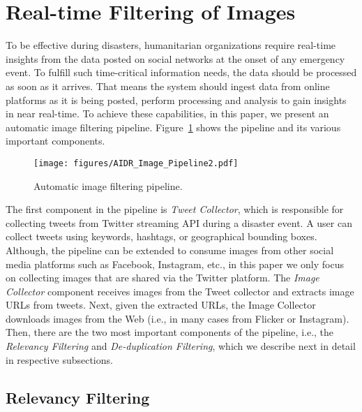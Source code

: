 \documentclass{iscram}
\begin{document}
\section{Real-time Filtering of Images}%

To be effective during disasters, humanitarian organizations require real-time insights from the data posted on social networks at the onset of any emergency event. To fulfill such time-critical information needs, the data should be processed as soon as it arrives. That means the system should ingest data from online platforms as it is being posted, perform processing and analysis to gain insights in near real-time. To achieve these capabilities, in this paper, we present an automatic image filtering pipeline. Figure~\ref{fig:pipeline} shows the pipeline and its various important components.

\begin{figure}[!htb]
\centering \texttt{[image: figures/AIDR\_Image\_Pipeline2.pdf]}
\caption{Automatic image filtering pipeline.
}
\label{fig:pipeline}
\end{figure}The first component in the pipeline is \emph{Tweet Collector}, which is responsible for collecting tweets from Twitter streaming API during a disaster event. A user can collect tweets using keywords, hashtags, or geographical bounding boxes. Although, the pipeline can be extended to consume images from other social media platforms such as Facebook, Instagram, etc., in this paper we only focus on collecting images that are shared via the Twitter platform. The \emph{Image Collector} component receives images from the Tweet collector and extracts image URLs from tweets. Next, given the extracted URLs, the Image Collector downloads images from the Web (i.e., in many cases from Flicker or Instagram). Then, there are the two most important components of the pipeline, i.e., the \emph{Relevancy Filtering} and \emph{De-duplication Filtering}, which we describe next in detail in respective subsections.

\subsection{Relevancy Filtering}%
\end{document}
